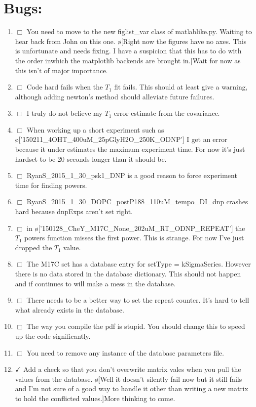 \documentclass[10pt]{book}
\begin{document}
\section{Bugs:}
\begin{enumerate}
    \item $\Box$ You need to move to the new figlist\_var class of matlablike.py. Waiting to hear back from John on this one. \o[Right now the figures have no axes. This is unfortunate and needs fixing. I have a suspicion that this has to do with the order inwhich the matplotlib backends are brought in.]{Wait for now as this isn't of major importance.}
    \item $\Box$ Code hard fails when the $T_1$ fit fails. This should at least give a warning, although adding newton's method should alleviate future failures.
    \item $\Box$ I truly do not believe my $T_1$ error estimate from the covariance.
    \item $\Box$ When working up a short experiment such as \o['150211_4OHT_400uM_25pGlyH2O_250K_ODNP']{} I get an error because it under estimates the maximum experiment time. For now it's just hardset to be 20 seconds longer than it should be.
    \item $\Box$ RyanS_2015_1_30_psk1_DNP is a good reason to force experiment time for finding powers.
    \item $\Box$ RyanS_2015_1_30_DOPC_postP188_110uM_tempo_DI_dnp crashes hard because dnpExps aren't set right. 
    \item $\Box$ in \o['150128_CheY_M17C_None_202uM_RT_ODNP_REPEAT']{} the $T_1$ powers function misses the first power. This is strange. For now I've just dropped the $T_1$ value.
    \item $\Box$ The M17C set has a database entry for setType = kSigmaSeries. However there is no data stored in the database dictionary. This should not happen and if continues to will make a mess in the database.
    \item $\Box$ There needs to be a better way to set the repeat counter. It's hard to tell what already exists in the database.
    \item $\Box$ The way you compile the pdf is stupid. You should change this to speed up the code significantly.
    \item $\Box$ You need to remove any instance of the database parameters file.
    \item $\checkmark$ Add a check so that you don't overwrite matrix vales when you pull the values from the database. \o[Well it doesn't silently fail now but it still fails and I'm not sure of a good way to handle it other than writing a new matrix to hold the conflicted values.]{More thinking to come.}

\end{enumerate}
\end{document}
